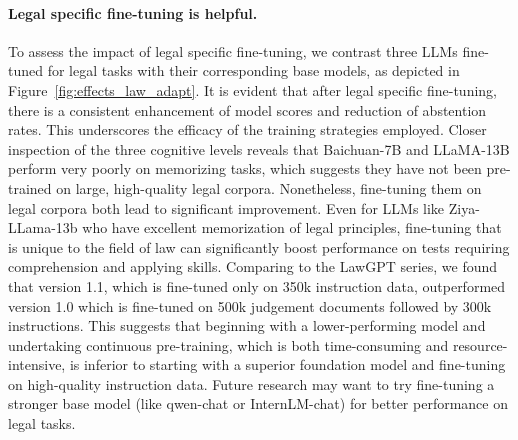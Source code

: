\paragraph{Legal specific fine-tuning is helpful.} 

To assess the impact of legal specific fine-tuning, we contrast three LLMs fine-tuned for legal tasks with their corresponding base models, as depicted in Figure~\ref{fig:effects_law_adapt}. It is evident that after legal specific fine-tuning, there is a consistent enhancement of model scores and reduction of abstention rates. This underscores the efficacy of the training strategies employed. Closer inspection of the three cognitive levels reveals that Baichuan-7B and LLaMA-13B perform very poorly on memorizing tasks, which suggests they have not been pre-trained on large, high-quality legal corpora. Nonetheless, fine-tuning them on legal corpora both lead to significant improvement. Even for LLMs like Ziya-LLama-13b who have excellent memorization of legal principles, fine-tuning that is unique to the field of law can significantly boost performance on tests requiring comprehension and applying skills. Comparing to the LawGPT series, we found that version 1.1, which is fine-tuned only on 350k instruction data, outperformed version 1.0 which is fine-tuned on 500k judgement documents followed by 300k instructions. This suggests that beginning with a lower-performing model and undertaking continuous pre-training, which is both time-consuming and resource-intensive, is inferior to starting with a superior foundation model and fine-tuning on high-quality instruction data. Future research may want to try fine-tuning a stronger base model (like qwen-chat or InternLM-chat) for better performance on legal tasks.

								
								

       

